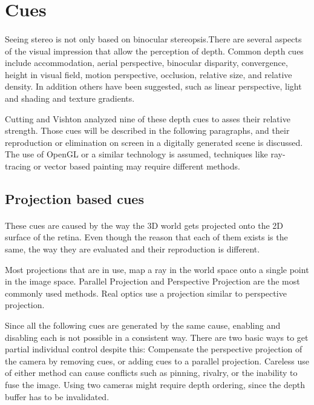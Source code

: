 \section{Cues\label{Cues}}
\paragraph{}
Seeing stereo is not only based on binocular stereopsis.There are several aspects of the visual impression that allow the perception of depth. Common depth cues include accommodation, aerial perspective, binocular disparity, convergence, height in visual field, motion perspective, occlusion, relative size, and relative density. In addition others have been suggested, such as linear perspective, light and shading and texture gradients.%

Cutting and Vishton\cite{DepthCues} analyzed nine of these depth cues to asses their relative strength. Those cues will be described in the following paragraphs, and their reproduction or elimination on screen in a digitally generated scene is discussed. The use of OpenGL or a similar technology is assumed, techniques like ray-tracing or vector based painting may require different methods.


\subsection{Projection based cues}
\paragraph{}
These cues are caused by the way the 3D world gets projected onto the 2D surface of the retina.
Even though the reason that each of them exists is the same, the way they are evaluated and their reproduction is different.

Most projections\cite{proj} that are in use, map a ray in the world space onto a single point in the image space. Parallel Projection\cite{parallel} and Perspective Projection\cite{perspective} are the most commonly used methods. Real optics use a projection similar to perspective projection.

Since all the following cues are generated by the same cause, enabling and disabling each is not possible in a consistent way. There are two basic ways to get partial individual control despite this: Compensate  the perspective projection of the camera by removing cues, or  adding cues to a parallel projection. Careless use of either method can cause conflicts such as pinning, rivalry, or the inability to fuse the image.
Using two cameras might require depth ordering, since the depth buffer has to be invalidated.


